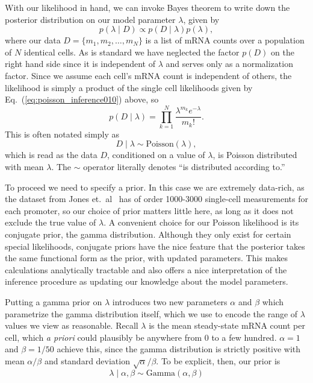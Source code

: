 \documentclass[12pt]{article}%
\newcommand{\eq}[1]{Eq.~(\ref{#1})}
\begin{document}
With our likelihood in hand, we can invoke Bayes theorem to write down
the posterior distribution
on our model parameter $\lambda$, given by
\begin{equation}
p(\lambda\mid D) \propto p(D\mid\lambda) p(\lambda),
\end{equation}
where our data $D=\{m_1, m_2,\dots, m_N\}$ is a list of mRNA counts
over a population of $N$ identical cells.
As is standard we have neglected the factor $p(D)$ on the right
hand side since it is independent of $\lambda$ and serves only as
a normalization factor.
Since we assume each cell's mRNA count is independent of others,
the likelihood is simply a product of the
single cell likelihoods given by \eq{eq:poisson_inference010} above, so
\begin{equation}
p(D\mid\lambda) = \prod_{k=1}^N \frac{\lambda^{m_k}e^{-\lambda}}{m_k!}.
\end{equation}
This is often notated simply as
\begin{equation}
D\mid\lambda \sim \text{Poisson}(\lambda),
\end{equation}
which is read as the data $D$, conditioned on a value of
$\lambda$, is Poisson distributed with mean $\lambda$.
The $\sim$ operator literally denotes ``is distributed according to.''

To proceed we need to specify a prior. In this case we are extremely data-rich,
as the dataset from Jones et.\ al~\cite{Jones2014} has of order
1000-3000 single-cell measurements for each promoter,
so our choice of prior matters little here,
as long as it does not exclude the true value of $\lambda$.
A convenient choice for our Poisson likelihood is its conjugate prior,
the gamma distribution. Although they only exist for
certain special likelihoods, conjugate priors have the nice
feature that the posterior takes the same functional form as the
prior, with updated parameters. This makes calculations
analytically tractable and also offers a nice interpretation of
the inference procedure as updating our knowledge about the model
parameters.

Putting a gamma prior on $\lambda$ introduces two new parameters
$\alpha$ and $\beta$ which parametrize the gamma distribution
itself, which we use to encode the range of $\lambda$ values we
view as reasonable. Recall $\lambda$ is the mean steady-state
mRNA count per cell, which \textit{a priori} could plausibly be
anywhere from 0 to a few hundred. $\alpha=1$ and $\beta=1/50$
achieve this, since the gamma distribution is strictly positive
with mean $\alpha/\beta$ and standard deviation
$\sqrt{\alpha}/\beta$. To be explicit, then, our prior is
\begin{equation}
\lambda\mid\alpha,\beta \sim \text{Gamma}(\alpha, \beta)
\end{equation}
\end{document}
